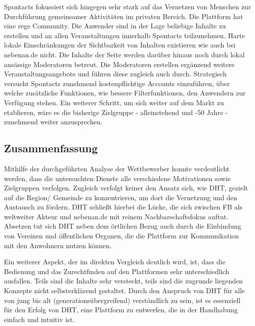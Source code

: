 Spontacts fokussiert sich hingegen sehr stark auf das Vernetzen von Menschen zur Durchführung gemeinsamer Aktivitäten im privaten Bereich. Die Plattform hat eine rege Community. Die Anwender sind in der Lage beliebige Inhalte zu erstellen und an allen Veranstaltungen innerhalb Spontacts teilzunehmen. Harte lokale Einschränkungen \bzgl der Sichtbarkeit von Inhalten existieren wie auch bei nebenan.de nicht.
Die Inhalte der Seite werden darüber hinaus noch durch lokal ansässige Moderatoren betreut. Die Moderatoren erstellen ergänzend weitere Veranstaltungsangebote und führen diese zugleich auch durch. Strategisch versucht Spontacts zunehmend kostenpflichtige Accounts einzuführen, über welche zusätzliche Funktionen, wie \bspw bessere Filterfunktionen, den Anwendern zur Verfügung stehen. Ein weiterer Schritt, um sich weiter auf dem Markt zu etablieren, wäre es die bisherige Zielgruppe - alleinstehend und -50 Jahre - zunehmend weiter anzusprechen.

\subsection{Zusammenfassung}

Mithilfe der durchgeführten Analyse der Wettbewerber konnte verdeutlicht werden, dass die untersuchten Dienste alle verschiedene Motivationen sowie Zielgruppen verfolgen. Zugleich verfolgt keiner den Ansatz sich, wie DHT, gezielt auf die Region/ Gemeinde zu konzentrieren, um dort die Vernetzung und den Austausch zu fördern. DHT schließt hierbei die Lücke, die sich zwischen FB als weltweiter Akteur und nebenan.de mit reinem Nachbarschaftsfokus auftut. Absetzen tut sich DHT neben dem örtlichen Bezug auch durch die Einbindung von Vereinen und öffentlichen Organen, die die Plattform zur Kommunikation mit den Anwohnern nutzen können.

Ein weiterer Aspekt, der im direkten Vergleich deutlich wird, ist, dass die Bedienung und das Zurechtfinden auf den Plattformen sehr unterschiedlich ausfallen. Teils sind die Inhalte sehr versteckt, teils sind die zugrunde liegenden Konzepte nicht selbsterklärend gestaltet. Durch den Anspruch von DHT für alle von jung bis alt (generationsübergreifend) verständlich zu sein, ist es essenziell für den Erfolg von DHT, eine Plattform zu entwerfen, die in der Handhabung einfach und intuitiv ist.

